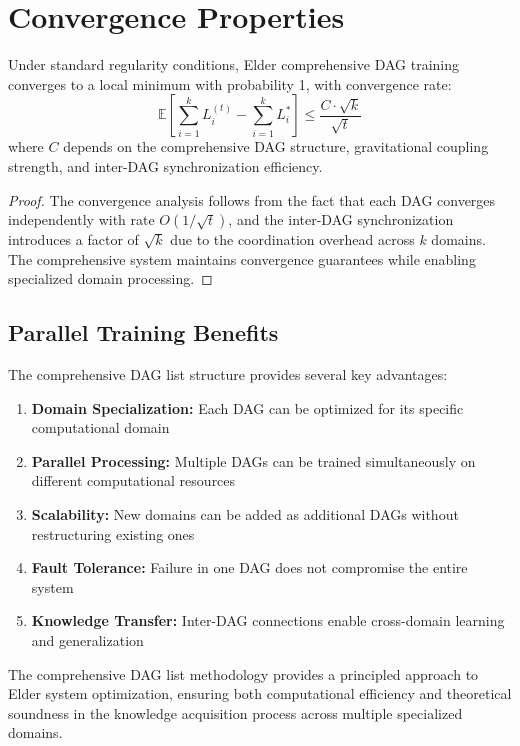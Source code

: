 \section{Convergence Properties}

\begin{theorem}
Under standard regularity conditions, Elder comprehensive DAG training converges to a local minimum with probability 1, with convergence rate:
\begin{equation}
\mathbb{E}\left[\sum_{i=1}^k L_i^{(t)} - \sum_{i=1}^k L_i^*\right] \leq \frac{C \cdot \sqrt{k}}{\sqrt{t}}
\end{equation}
where $C$ depends on the comprehensive DAG structure, gravitational coupling strength, and inter-DAG synchronization efficiency.
\end{theorem}

\begin{proof}
The convergence analysis follows from the fact that each DAG converges independently with rate $O(1/\sqrt{t})$, and the inter-DAG synchronization introduces a factor of $\sqrt{k}$ due to the coordination overhead across $k$ domains. The comprehensive system maintains convergence guarantees while enabling specialized domain processing.
\end{proof}

\subsection{Parallel Training Benefits}

The comprehensive DAG list structure provides several key advantages:

\begin{enumerate}
    \item \textbf{Domain Specialization:} Each DAG can be optimized for its specific computational domain
    \item \textbf{Parallel Processing:} Multiple DAGs can be trained simultaneously on different computational resources
    \item \textbf{Scalability:} New domains can be added as additional DAGs without restructuring existing ones
    \item \textbf{Fault Tolerance:} Failure in one DAG does not compromise the entire system
    \item \textbf{Knowledge Transfer:} Inter-DAG connections enable cross-domain learning and generalization
\end{enumerate}

The comprehensive DAG list methodology provides a principled approach to Elder system optimization, ensuring both computational efficiency and theoretical soundness in the knowledge acquisition process across multiple specialized domains.